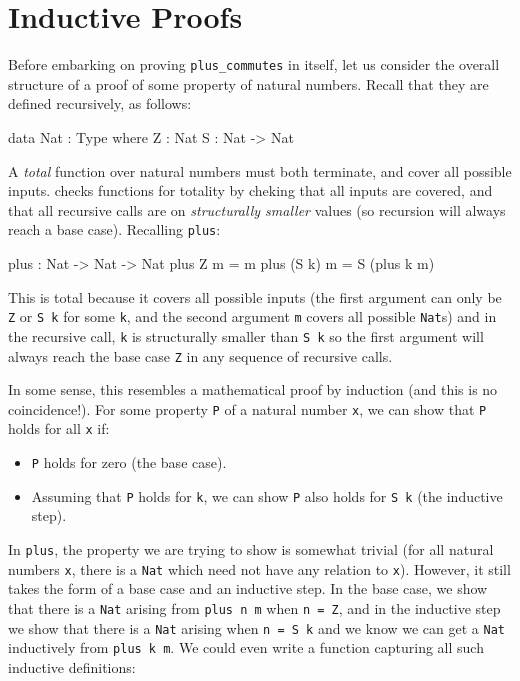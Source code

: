 \section{Inductive Proofs}

\label{sect:induction}

Before embarking on proving \texttt{plus\_commutes} in \Idris{} itself, let
us consider the overall structure of a proof of some property of
natural numbers. Recall that they are defined recursively, as follows:

\begin{code}
data Nat : Type where
     Z : Nat
     S : Nat -> Nat
\end{code}

\noindent
A \emph{total} function over natural numbers must both terminate, and cover
all possible inputs. \Idris{} checks functions for totality by cheking that
all inputs are covered, and that all recursive calls are on \emph{structurally
smaller} values (so recursion will always reach a base case). Recalling
\texttt{plus}:

\begin{code}
plus : Nat -> Nat -> Nat
plus Z     m = m
plus (S k) m = S (plus k m)
\end{code}

\noindent
This is total because it covers all possible inputs (the first argument can
only be \texttt{Z} or \texttt{S k} for some \texttt{k}, and the second 
argument \texttt{m} covers all possible \texttt{Nat}s) and in the recursive
call, \texttt{k} is structurally smaller than \texttt{S k} so the first argument
will always reach the base case \texttt{Z} in any sequence of recursive calls.

In some sense, this resembles a mathematical proof by induction (and this is
no coincidence!). For some property \texttt{P} of a natural number \texttt{x},
we can show that \texttt{P} holds for all \texttt{x} if:

\begin{itemize}
\item \texttt{P} holds for zero (the base case).
\item Assuming that \texttt{P} holds for \texttt{k}, we can show \texttt{P}
also holds for \texttt{S k} (the inductive step).
\end{itemize}

\noindent
In \texttt{plus}, the property we are trying to show is somewhat trivial (for
all natural numbers \texttt{x}, there is a \texttt{Nat} which need not have any
relation to \texttt{x}). However, it still takes the form of a base case
and an inductive step. In the base case, we show that there is a \texttt{Nat}
arising from \texttt{plus n m} when \texttt{n = Z}, and in the inductive
step we show that there is a \texttt{Nat} arising when \texttt{n = S k}
and we know we can get a \texttt{Nat} inductively from \texttt{plus k m}.
%
We could even write a function capturing all such inductive definitions:

